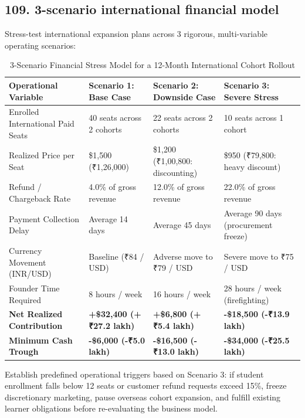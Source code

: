 \subsection{109. 3-scenario international financial model}

Stress-test international expansion plans across 3 rigorous, multi-variable operating scenarios:

\begin{table}[t]
\centering
\small
\caption{3-Scenario Financial Stress Model for a 12-Month International Cohort Rollout}
\label{tab:scenario_model}
\begin{tabularx}{\textwidth}{p{3.2cm} p{3.8cm} p{3.8cm} X}
\toprule
\textbf{Operational Variable} & \textbf{Scenario 1: Base Case} & \textbf{Scenario 2: Downside Case} & \textbf{Scenario 3: Severe Stress} \\
\midrule
Enrolled International Paid Seats & 40 seats across 2 cohorts & 22 seats across 2 cohorts & 10 seats across 1 cohort \\
Realized Price per Seat & \$1,500 (₹1,26,000) & \$1,200 (₹1,00,800: discounting) & \$950 (₹79,800: heavy discount) \\
Refund / Chargeback Rate & 4.0\% of gross revenue & 12.0\% of gross revenue & 22.0\% of gross revenue \\
Payment Collection Delay & Average 14 days & Average 45 days & Average 90 days (procurement freeze) \\
Currency Movement (INR/USD) & Baseline (₹84 / USD) & Adverse move to ₹79 / USD & Severe move to ₹75 / USD \\
Founder Time Required & 8 hours / week & 16 hours / week & 28 hours / week (firefighting) \\
\midrule
\textbf{Net Realized Contribution} & \textbf{+\$32,400 (+₹27.2 lakh)} & \textbf{+\$6,800 (+₹5.4 lakh)} & \textbf{-\$18,500 (-₹13.9 lakh)} \\
\textbf{Minimum Cash Trough} & \textbf{-\$6,000 (-₹5.0 lakh)} & \textbf{-\$16,500 (-₹13.0 lakh)} & \textbf{-\$34,000 (-₹25.5 lakh)} \\
\bottomrule
\end{tabularx}
\end{table}

Establish predefined operational triggers based on Scenario 3: if student enrollment falls below 12 seats or customer refund requests exceed 15\%, freeze discretionary marketing, pause overseas cohort expansion, and fulfill existing learner obligations before re-evaluating the business model.

